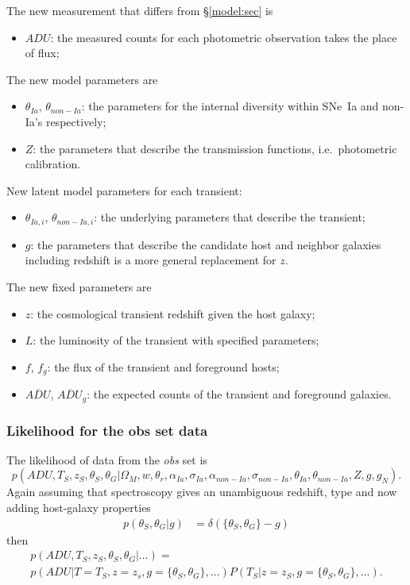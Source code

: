 \documentclass[preprint,3p]{elsarticle}
\begin{document}
The new measurement that differs from  \S\ref{model:sec} is
\begin{itemize}
\item $\mathit{ADU}$: the measured counts for each photometric observation takes
the place of flux;
\end{itemize}
The new model parameters are
\begin{itemize}
\item $\theta_{Ia}$, $\theta_{non-Ia}$: the parameters for the internal diversity within SNe~Ia and
non-Ia's respectively;
\item $Z$: the parameters that describe the transmission functions, i.e.\ photometric calibration.
\end{itemize}
New latent model parameters for each transient:
\begin{itemize}
\item $\theta_{Ia,i}$, $\theta_{non-Ia,i}$: the underlying parameters that describe the transient;
\item $g$: the parameters that describe the candidate host and neighbor galaxies including redshift
is a more general replacement for $z$.
\end{itemize}
The new fixed parameters are
\begin{itemize}
\item{$z$}: the cosmological transient redshift given the host galaxy;
\item{$L$}: the luminosity of the transient with specified parameters;
\item{$f$, $f_g$}: the flux of the transient and foreground hosts;
\item{$\overline{\mathit{ADU}}$, $\overline{\mathit{ADU}}_g$}: the expected counts of the
transient and foreground galaxies.
\end{itemize}

\subsubsection{Likelihood for the obs set data}
The likelihood of data from the {\it obs} set is
\begin{equation}
p(\mathit{ADU}, {{T}}_S,{{z}}_S, \theta_S, \theta_G|  \Omega_M, w, \theta_r,\alpha_{Ia},\sigma_{Ia}, \alpha_{\mathit{non-Ia}},\sigma_{\mathit{non-Ia}}, \theta_{Ia}, \theta_{non-Ia}, Z, g, g_N).
\end{equation}
Again assuming that spectroscopy gives an unambiguous redshift, type and now adding
host-galaxy properties 
\begin{align}
p(\theta_S, \theta_G|g) &= \delta(\{\theta_S, \theta_G\} -g)
\end{align}
then
\begin{multline}
p(\mathit{ADU}, {{T}}_S,{{z}}_S, \theta_S, \theta_G|  \ldots) = \\
p(\mathit{ADU} | T=T_S, z=z_s, g=\{\theta_S, \theta_G\},  \dots) P(T_S| z= z_S , g=\{\theta_S, \theta_G\}, \ldots).
\label{obs3:eqn}
\end{multline}
\end{document}
